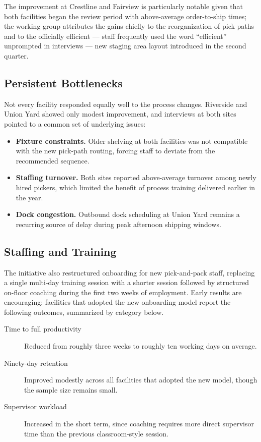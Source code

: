 \documentclass[11pt]{article}
\begin{document}
The improvement at Crestline and Fairview is particularly notable given
that both facilities began the review period with above-average
order-to-ship times; the working group attributes the gains chiefly to the
reorganization of pick paths and to the officially efficient --- staff
frequently used the word ``efficient'' unprompted in interviews --- new
staging area layout introduced in the second quarter.

\subsection{Persistent Bottlenecks}
Not every facility responded equally well to the process changes.
Riverside and Union Yard showed only modest improvement, and interviews at
both sites pointed to a common set of underlying issues:

\begin{itemize}
  \item \textbf{Fixture constraints.} Older shelving at both facilities
  was not compatible with the new pick-path routing, forcing staff to
  deviate from the recommended sequence.
  \item \textbf{Staffing turnover.} Both sites reported above-average
  turnover among newly hired pickers, which limited the benefit of
  process training delivered earlier in the year.
  \item \textbf{Dock congestion.} Outbound dock scheduling at Union Yard
  remains a recurring source of delay during peak afternoon shipping
  windows.
\end{itemize}

\subsection{Staffing and Training}
The initiative also restructured onboarding for new pick-and-pack staff,
replacing a single multi-day training session with a shorter session
followed by structured on-floor coaching during the first two weeks of
employment. Early results are encouraging: facilities that adopted the new
onboarding model report the following outcomes, summarized by category
below.

\begin{description}
  \item[Time to full productivity] Reduced from roughly three weeks to
  roughly ten working days on average.
  \item[Ninety-day retention] Improved modestly across all facilities that
  adopted the new model, though the sample size remains small.
  \item[Supervisor workload] Increased in the short term, since coaching
  requires more direct supervisor time than the previous classroom-style
  session.
\end{description}
\end{document}

